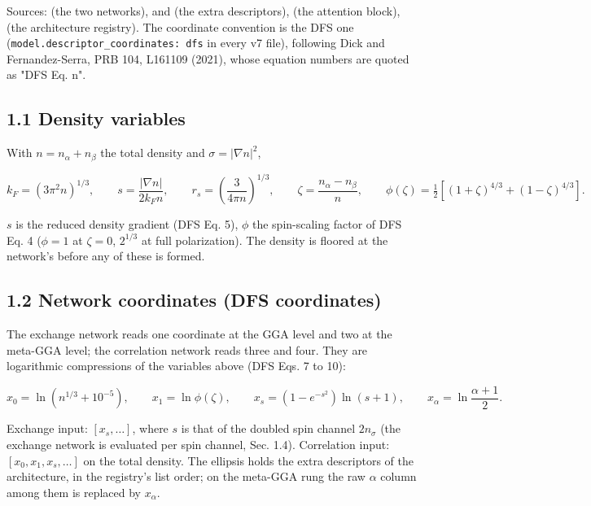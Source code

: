 \documentclass[10pt,a4paper]{article}
\begin{document}
Sources:  (the two networks),  and  (the extra descriptors),  (the attention block),  (the architecture registry). The coordinate convention is the DFS one (\texttt{model.descriptor\_coordinates: dfs} in every v7 file), following Dick and Fernandez-Serra, PRB 104, L161109 (2021), whose equation numbers are quoted as "DFS Eq. n".

\subsection*{1.1 Density variables}

With $n = n_\alpha + n_\beta$ the total density and $\sigma = |\nabla n|^2$,

\[
k_F = (3\pi^2 n)^{1/3}, \qquad
s = \frac{|\nabla n|}{2 k_F n}, \qquad
r_s = \left(\frac{3}{4\pi n}\right)^{1/3}, \qquad
\zeta = \frac{n_\alpha - n_\beta}{n}, \qquad
\phi(\zeta) = \tfrac12\left[(1+\zeta)^{4/3} + (1-\zeta)^{4/3}\right].
\]

$s$ is the reduced density gradient (DFS Eq. 5), $\phi$ the spin-scaling factor of DFS Eq. 4 ($\phi = 1$ at $\zeta = 0$, $2^{1/3}$ at full polarization). The density is floored at the network's  before any of these is formed.

\subsection*{1.2 Network coordinates (DFS coordinates)}

The exchange network reads one coordinate at the GGA level and two at the meta-GGA level; the correlation network reads three and four. They are logarithmic compressions of the variables above (DFS Eqs. 7 to 10):

\[
x_0 = \ln\!\left(n^{1/3} + 10^{-5}\right), \qquad
x_1 = \ln \phi(\zeta), \qquad
x_s = \left(1 - e^{-s^2}\right)\ln(s + 1), \qquad
x_\alpha = \ln\frac{\alpha + 1}{2}.
\]

Exchange input: $[x_s, \ldots]$, where $s$ is that of the doubled spin channel $2 n_\sigma$ (the exchange network is evaluated per spin channel, Sec. 1.4). Correlation input: $[x_0, x_1, x_s, \ldots]$ on the total density. The ellipsis holds the extra descriptors of the architecture, in the registry's list order; on the meta-GGA rung the raw $\alpha$ column among them is replaced by $x_\alpha$.
\end{document}
